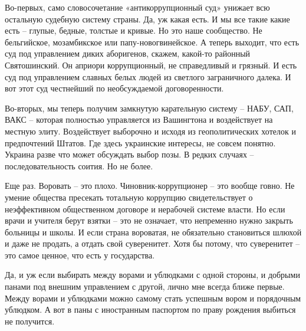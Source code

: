 Во-первых, само словосочетание «антикоррупционный суд» унижает всю остальную
судебную систему страны. Да, уж какая есть. И мы все такие какие есть – глупые,
бедные, толстые и кривые. Но это наше сообщество. Не бельгийское, мозамбикское
или папу-новогвинейское. А теперь выходит, что есть суд под управлением диких
аборигенов, скажем, какой-то районный Святошинский. Он априори коррупционный,
не справедливый и грязный. И есть суд под управлением славных белых людей из
светлого заграничного далека. И вот этот суд честнейший по необсуждаемой
договоренности.

Во-вторых, мы теперь получим замкнутую карательную систему – НАБУ, САП, ВАКС –
которая полностью управляется из Вашингтона и воздействует на местную элиту.
Воздействует выборочно и исходя из геополитических хотелок и предпочтений
Штатов. Где здесь украинские интересы, не совсем понятно. Украина разве что
может обсуждать выбор позы. В редких случаях – последовательность соития. Но не
более.

Еще раз. Воровать – это плохо. Чиновник-коррупционер – это вообще говно. Не
умение общества пресекать тотальную коррупцию свидетельствует о неэффективном
общественном договоре и нерабочей системе власти. Но если врачи и учителя берут
взятки – это не означает, что непременно нужно закрыть больницы и школы. И если
страна вороватая, не обязательно становиться шлюхой и даже не продать, а отдать
свой суверенитет. Хотя бы потому, что суверенитет – это самое ценное, что есть
у государства.

Да, и уж если выбирать между ворами и ублюдками с одной стороны, и добрыми
панами под внешним управлением с другой, лично мне всегда ближе первые. Между
ворами и ублюдками можно самому стать успешным вором и порядочным ублюдком. А
вот в паны с иностранным паспортом по праву рождения выбиться не получится.

